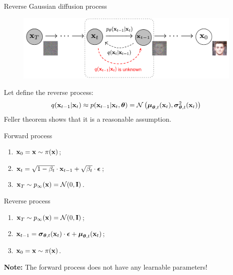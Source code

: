 \begin{frame}{Reverse Gaussian diffusion process}
	\vspace{-0.3cm} 
	\begin{figure}
		\includegraphics[width=0.8\linewidth]{figs/DDPM}
	\end{figure}
	\vspace{-0.3cm} 
	Let define the reverse process: 
	\vspace{-0.2cm}
	\[
		q(\mathbf{x}_{t-1}|\mathbf{x}_{t}) \approx p(\mathbf{x}_{t - 1} | \mathbf{x}_t, \boldsymbol{\theta}) = \mathcal{N} \left(\boldsymbol{\mu}_{\boldsymbol{\theta}, t}(\mathbf{x}_t), \boldsymbol{\sigma}_{\boldsymbol{\theta}, t}^2(\mathbf{x}_t)\right)
	\]
	{\color{gray}Feller theorem shows that it is a reasonable assumption.}
	\begin{minipage}{0.5\linewidth}
		\begin{block}{Forward process}
			\begin{enumerate}
				\item $\mathbf{x}_0 = \mathbf{x} \sim \pi(\mathbf{x})$;
				\item $\mathbf{x}_t = \sqrt{1 - \beta_t} \cdot \mathbf{x}_{t - 1} + \sqrt{\beta_t} \cdot \boldsymbol{\epsilon}$;
				\item $\mathbf{x}_T \sim p_{\infty}(\mathbf{x}) = \mathcal{N}(0, \mathbf{I})$.
			\end{enumerate}
		\end{block}
	\end{minipage}%
	\begin{minipage}{0.55\linewidth}
		\begin{block}{Reverse process}
			\begin{enumerate}
				\item $\mathbf{x}_T \sim p_{\infty}(\mathbf{x}) = \mathcal{N}(0, \mathbf{I})$;
				\item $\mathbf{x}_{t - 1} = \boldsymbol{\sigma}_{\boldsymbol{\theta}, t}(\mathbf{x}_t) \cdot \boldsymbol{\epsilon} + \boldsymbol{\mu}_{\boldsymbol{\theta}, t}(\mathbf{x}_t)$;
				\item $\mathbf{x}_0 = \mathbf{x} \sim \pi(\mathbf{x})$.
			\end{enumerate}
		\end{block}
	\end{minipage}
	\textbf{Note:} The forward process does not have any learnable parameters!
\end{frame}
